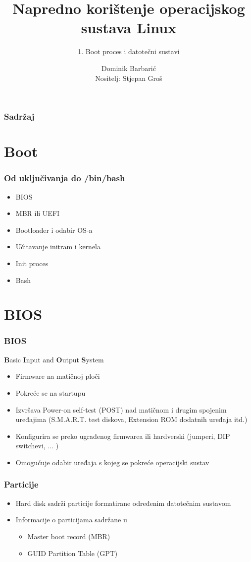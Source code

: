 \documentclass[t]{beamer}
\date{\todayiso}
\title[NKOSL]{Napredno korištenje operacijskog sustava Linux}
\author[Dominik Barbarić]{Dominik Barbarić\\{\small Nositelj: Stjepan Groš}}
\subtitle{1. Boot proces i datotečni sustavi}
\institute[FER]{Sveučilište u Zagrebu\\Fakultet elektrotehnike i računarstva}
\begin{document}
{
	\begin{frame}
		\maketitle
	\end{frame}
}

\begin{frame}
	\frametitle{Sadržaj}
	\tableofcontents
\end{frame}

\section{Boot}
\begin{frame}
    \frametitle{Od uključivanja do /bin/bash}
    \begin{itemize}
        \item BIOS 
        \item MBR ili UEFI
        \item Bootloader i odabir OS-a
        \item Učitavanje initram i kernela
        \item Init proces 
        \item Bash
    \end{itemize}
\end{frame}


\section{BIOS}
\begin{frame}
	\frametitle{BIOS}
	\textbf{B}asic \textbf{I}nput and \textbf{O}utput \textbf{S}ystem
	\begin{itemize}
		\item Firmware na matičnoj ploči
		\item Pokreće se na startupu
		\item Izvršava Power-on self-test (POST) nad matičnom i drugim spojenim uređajima (S.M.A.R.T. test diskova, Extension ROM dodatnih uređaja itd.)
		\item Konfigurira se preko ugrađenog firmwarea ili hardverski (jumperi, DIP switchevi, ... )
		\item Omogućuje odabir uređaja s kojeg se pokreće operacijski sustav
	\end{itemize}
\end{frame}

\begin{frame}
	\frametitle{Particije}
	\begin{itemize}
		\item Hard disk sadrži particije formatirane određenim datotečnim sustavom
		\item Informacije o particijama sadržane u
		\begin{itemize}
			\item Master boot record (MBR)
			\item GUID Partition Table (GPT)
		\end{itemize}
	\end{itemize}
\end{frame}	
\end{document}
